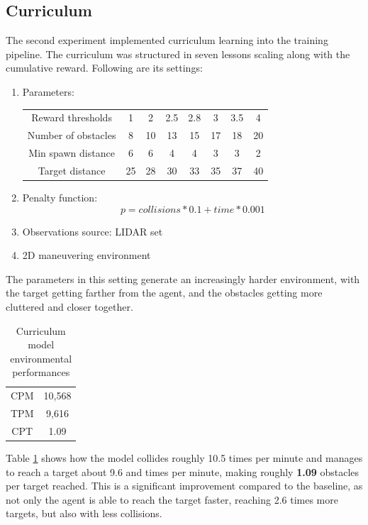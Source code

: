 \documentclass{ifacconf}
\begin{document}
\subsection{Curriculum}
The second experiment implemented curriculum learning into the training pipeline. The curriculum was structured in seven lessons scaling along with the cumulative reward. Following are its settings:
\begin{enumerate}
    \item Parameters:
        \begin{table}[ht]
            \centering
            \begin{tabular}[t]{cccccccc}
                Reward thresholds&1&2&2.5&2.8&3&3.5&4\\
                Number of obstacles&8&10&13&15&17&18&20\\
                Min spawn distance&6&6&4&4&3&3&2\\
                Target distance&25&28&30&33&35&37&40\\
            \end{tabular}
        \end{table}%
    \item Penalty function: $$p=collisions*0.1+time*0.001$$
    \item Observations source: LIDAR set
    \item 2D maneuvering environment
\end{enumerate}

The parameters in this setting generate an increasingly harder environment, with the target getting farther from the agent, and the obstacles getting more cluttered and closer together.

\begin{table}[ht]
\centering
\caption{Curriculum model environmental performances}
\label{tab:curric}
\begin{tabular}[t]{cc}
\hline
CPM&10,568\\
TPM&9,616\\
CPT&1.09\\
\hline
\end{tabular}
\end{table}%

Table \ref{tab:curric} shows how the model collides roughly 10.5 times per minute and manages to reach a target about 9.6 and times per minute, making roughly \textbf{1.09} obstacles per target reached. This is a significant improvement compared to the baseline, as not only the agent is able to reach the target faster, reaching 2.6 times more targets, but also with less collisions.
\end{document}
